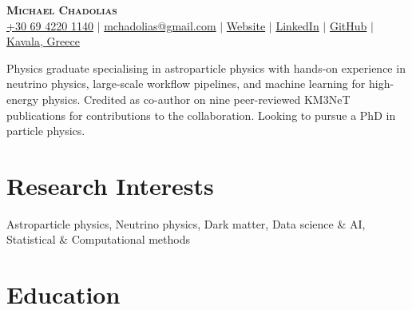 \documentclass[letterpaper,11pt]{article}
\begin{document}

\begin{center}
    \textbf{\Huge \scshape Michael Chadolias} \\ \vspace{3pt}
    \small
    \faMobile \hspace{.5pt} \href{tel:00306942201140}{+30 69 4220 1140}
    $|$
    \faAt \hspace{.5pt} \href{mailto:mchadolias@gmail.com}{mchadolias@gmail.com}
    $|$
    \faGlobe \hspace{.5pt} \href{https://mchadolias.github.io/}{Website}
    $|$
    \faLinkedinSquare \hspace{.5pt} \href{https://www.linkedin.com/in/michael-chadolias/}{LinkedIn}
    $|$
    \faGithub \hspace{.5pt} \href{https://github.com/mchadolias}{GitHub}
    $|$
    \faMapMarker \hspace{.5pt} \href{https://www.google.gr/maps/place/%CE%9A%CE%B1%CE%B2%CE%AC%CE%BB%CE%B1/@40.9369136,24.3686038,14z/data=!3m1!4b1!4m6!3m5!1s0x14aebb729066fc01:0xf567e137446a476c!8m2!3d40.937607!4d24.412866!16zL20vMDFqMWIx?entry=ttu&g_ep=EgoyMDI1MDYzMC4wIKXMDSoASAFQAw%3D%3D}{Kavala, Greece}
\end{center}

Physics graduate specialising in astroparticle physics with hands-on experience in neutrino physics, large-scale workflow pipelines, and machine learning for high-energy physics. Credited as co-author on nine peer-reviewed KM3NeT publications for contributions to the collaboration. Looking to pursue a PhD in particle physics.
\vspace{1.5pt}


\section{Research Interests}
  \vspace{2pt}
  \resumeSubHeadingListStart
    \small{\item{
        {Astroparticle physics, Neutrino physics, Dark matter, Data science \& AI, Statistical \& Computational methods} 
    }}
  \resumeSubHeadingListEnd

\section{Education}
  \vspace{3pt}
  \resumeSubHeadingListStart
    
\end{document}
